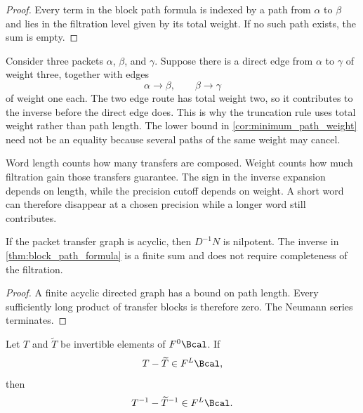 \begin{proof}
Every term in the block path formula is indexed by a path from $\alpha$ to $\beta$ and lies in the filtration level given by its total weight.  If no such path exists, the sum is empty.
\end{proof}

\begin{example}\label{ex:weighted_route}
Consider three packets $\alpha$, $\beta$, and $\gamma$.  Suppose there is a direct edge from $\alpha$ to $\gamma$ of weight three, together with edges
\[
\alpha\longrightarrow\beta,
\qquad
\beta\longrightarrow\gamma
\]
of weight one each.  The two edge route has total weight two, so it contributes to the inverse before the direct edge does.  This is why the truncation rule uses total weight rather than path length. The lower bound in \cref{cor:minimum_path_weight} need not be an equality because several paths of the same weight may cancel.
\end{example}

\begin{keyidea}
Word length counts how many transfers are composed. Weight counts how much filtration gain those transfers guarantee. The sign in the inverse expansion depends on length, while the precision cutoff depends on weight. A short word can therefore disappear at a chosen precision while a longer word still contributes.
\end{keyidea}

\begin{corollary}\label{cor:acyclic_inverse}
If the packet transfer graph is acyclic, then $D^{-1}N$ is nilpotent.  The inverse in \cref{thm:block_path_formula} is a finite sum and does not require completeness of the filtration.
\end{corollary}

\begin{proof}
A finite acyclic directed graph has a bound on path length.  Every sufficiently long product of transfer blocks is therefore zero.  The Neumann series terminates.
\end{proof}

\begin{corollary}\label{cor:inverse_stability}
Let $T$ and $\widetilde T$ be invertible elements of $F^0\Bcal$.  If
\[
T-\widetilde T\in F^L\Bcal,
\]
then
\[
T^{-1}-\widetilde T^{-1}\in F^L\Bcal.
\]
\end{corollary}

